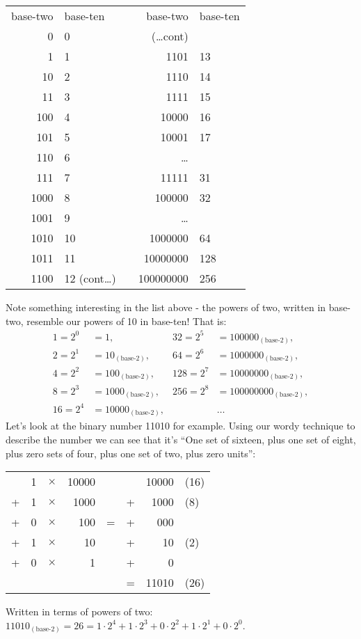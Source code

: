 \documentclass{article}
\begin{document}
\begin{center}
\begin{tabular}{r l c r l}
base-two & base-ten & \; \; \; \; & base-two & base-ten\\
0 & 0 & \phantom& (\dots cont)\\
1 & 1 & \phantom& 1101 & 13\\
10 & 2 & \phantom& 1110 & 14\\
11 & 3 & \phantom& 1111 & 15\\
100 & 4 & \phantom& 10000 & 16\\
101 & 5 & \phantom& 10001 & 17\\
110 & 6 & \phantom& \dots{}\\
111 & 7 & \phantom& 11111 & 31\\
1000 & 8 & \phantom& 100000 & 32\\
1001 & 9 & \phantom& \dots{}\\
1010 & 10 & \phantom & 1000000 & 64\\
1011 & 11 & \phantom& 10000000 & 128\\
1100 & 12 (cont\dots) & \phantom& 100000000 & 256
\end{tabular}
\end{center}

Note something interesting in the list above - the powers of two,
written in base-two,
resemble our powers of 10 in base-ten! That is:
\begin{align*}
1 = 2^0&= 1, & 32 = 2^5&= 100000_{(\text{base-2})},\\
2 = 2^1&= 10_{(\text{base-2})}, & 64 = 2^6&= 1000000_{(\text{base-2})},\\
4 = 2^2&= 100_{(\text{base-2})}, & 128 = 2^7&= 10000000_{(\text{base-2})},\\
8 = 2^3&= 1000_{(\text{base-2})},& 256 = 2^8&= 100000000_{(\text{base-2})},\\
16 = 2^4&= 10000_{(\text{base-2})},& & \dots{}
\end{align*}
Let's look at the binary number 11010 for example.
Using our wordy technique to describe the number
we can see that it's ``One set of sixteen,
plus one set of eight, plus zero sets of four,
plus one set of two, plus zero units'': 
\begin{center}
\begin{tabular}{r r r r c r r l}
\phantom & 1 & $\times$ & 10000 & \phantom & \phantom & 10000 & (16)\\
+ & 1 & $\times$ & 1000 & \phantom & + & 1000 & (8)\\
+ & 0 & $\times$ & 100 & \; \; = \; \; & + & 000 & \\
+ & 1 & $\times$ & 10 & \phantom & + & 10 & (2)\\
+ & 0 & $\times$ & 1 & \phantom & + & 0\\
\cline{6-8}
\phantom & \phantom & \phantom & \phantom & \phantom & = & 11010 & (26)\\
\end{tabular}
\end{center}
Written in terms of powers of two:
$11010_{(\text{base-2})}=26=1\cdot2^4+1\cdot2^3+0\cdot2^2+1\cdot2^1+0\cdot2^0$.
\end{document}
